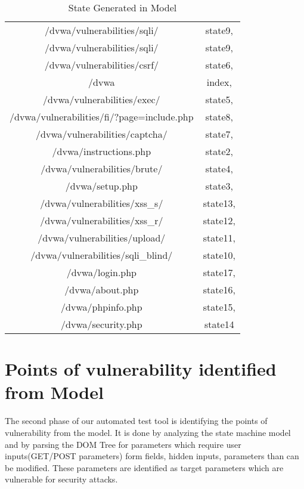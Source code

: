 \begin{table}[!h]
\centering
\caption{State Generated in Model}
\label{State Generated in Model}
\begin{tabular}{||c | c||}
\hline
/dvwa/vulnerabilities/sqli/                & state9,  \\
/dvwa/vulnerabilities/sqli/                & state9,  \\
/dvwa/vulnerabilities/csrf/                & state6,  \\
/dvwa                                      & index,   \\
/dvwa/vulnerabilities/exec/                & state5,  \\
/dvwa/vulnerabilities/fi/?page=include.php & state8,  \\
/dvwa/vulnerabilities/captcha/             & state7,  \\
/dvwa/instructions.php                     & state2,  \\
/dvwa/vulnerabilities/brute/               & state4,  \\
/dvwa/setup.php                            & state3,  \\
/dvwa/vulnerabilities/xss\_s/              & state13, \\
/dvwa/vulnerabilities/xss\_r/              & state12, \\
/dvwa/vulnerabilities/upload/              & state11, \\
/dvwa/vulnerabilities/sqli\_blind/         & state10, \\
/dvwa/login.php                            & state17, \\
/dvwa/about.php                            & state16, \\
/dvwa/phpinfo.php                          & state15, \\
/dvwa/security.php                         & state14 \\
\hline

\end{tabular}
\end{table}

\newpage

\section{Points of vulnerability identified from Model}

The second phase of our automated test tool is identifying the points of vulnerability from the model. 
It is done by analyzing the  state machine model and by parsing the DOM Tree for parameters which require user inputs(GET/POST parameters) form fields, hidden inputs, parameters than can be modified. These parameters are identified as target parameters which are vulnerable for security attacks.

